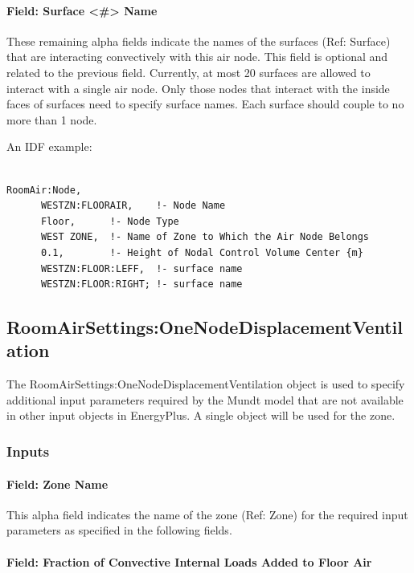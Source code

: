 \paragraph{Field: Surface \textless{}\#\textgreater{} Name}\label{field-surface-name-004}

These remaining alpha fields indicate the names of the surfaces (Ref: Surface) that are interacting convectively with this air node. This field is optional and related to the previous field. Currently, at most 20 surfaces are allowed to interact with a single air node. Only those nodes that interact with the inside faces of surfaces need to specify surface names. Each surface should couple to no more than 1 node.

An IDF example:

\begin{lstlisting}

RoomAir:Node,
      WESTZN:FLOORAIR,    !- Node Name
      Floor,      !- Node Type
      WEST ZONE,  !- Name of Zone to Which the Air Node Belongs
      0.1,        !- Height of Nodal Control Volume Center {m}
      WESTZN:FLOOR:LEFF,  !- surface name
      WESTZN:FLOOR:RIGHT; !- surface name
\end{lstlisting}

\subsection{RoomAirSettings:OneNodeDisplacementVentilation}\label{roomairsettingsonenodedisplacementventilation}

The RoomAirSettings:OneNodeDisplacementVentilation object is used to specify additional input parameters required by the Mundt model that are not available in other input objects in EnergyPlus. A single object will be used for the zone.

\subsubsection{Inputs}\label{inputs-7-022}

\paragraph{Field: Zone Name}\label{field-zone-name-3-005}

This alpha field indicates the name of the zone (Ref: Zone) for the required input parameters as specified in the following fields.

\paragraph{Field: Fraction of Convective Internal Loads Added to Floor Air}\label{field-fraction-of-convective-internal-loads-added-to-floor-air}

